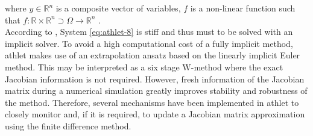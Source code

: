 where $y \in \mathbb{R}^{n}$ is a composite vector of variables, $f$ is a non-linear function such that $f : \mathbb{R} \times \mathbb{R}^{n} \supset \Omega  \rightarrow \mathbb{R}^{n}$  .\\



According to  \cite{lt:ATHLMaM}, System \ref{eq:athlet-8} is stiff and thus must to be solved with an implicit solver. To avoid a high computational cost of a fully implicit method, \acrshort{athlet} makes use of an extrapolation ansatz based on the linearly implicit Euler method. This may be interpreted as a six stage W-method where the exact Jacobian information is not required. However, fresh information of the Jacobian matrix during a numerical simulation greatly improves stability and robustness of the method. Therefore, several mechanisms have been implemented in \acrshort{athlet} to closely monitor and, if it is required, to update a Jacobian matrix approximation using the finite difference method.\\




